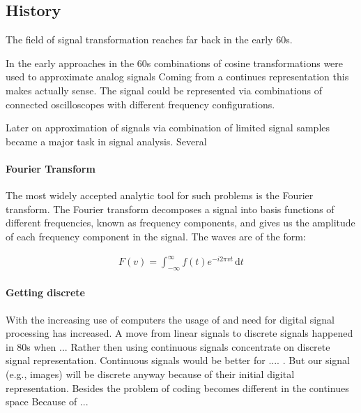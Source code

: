 \subsection{History}
\label{sec:history}
The field of signal transformation reaches far back in the early 60s.
\cite{Rubinstein2010}

In the early approaches in the 60s combinations of cosine
transformations were used to approximate analog signals Coming from a continues
representation this makes actually sense. The signal could be represented via
combinations of connected oscilloscopes with different frequency
configurations. 

Later on approximation of signals via combination of limited signal samples
became a major task in signal analysis. Several 

\paragraph{Fourier Transform}

The most widely accepted analytic tool for such problems is the Fourier
transform. The Fourier transform decomposes a signal into basis functions of
different frequencies, known as frequency components, and gives us the amplitude
of each frequency component in the signal. The waves are of the form:

\begin{align*}
 F\left(v\right) = \int_{-\infty}^{\infty} \! f(t)e^{-i2\pi vt} \,
\mathrm{d}t
\end{align*}






\paragraph{Getting discrete}

With the increasing use of computers the usage of and need for digital signal
processing has increased.
A move from linear signals to discrete signals happened in 80s when ... 
Rather then using continuous signals concentrate on discrete
signal representation. Continuous signals would be better for .... .  But our
signal (e.g., images) will be discrete anyway because of their initial digital
representation. Besides the problem of coding becomes different in the continues
space \cite{} Because of ...


